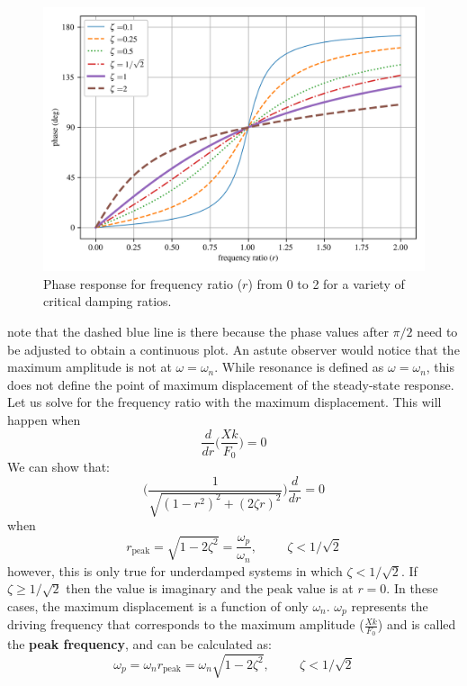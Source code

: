 \documentclass[12pt,letter]{article}
\begin{document}
	\begin{figure}[H]
		\centering
		\includegraphics[]{../figures/underdamped_frequency_response_phase.png}
		\caption{Phase response for frequency ratio ($r$) from 0 to 2 for a variety of critical damping ratios.}
		\label{fig:underdamped_frequency_response_phase}
	\end{figure}				
	\noindent note that the dashed blue line is there because the phase values after $\pi/2$ need to be adjusted to obtain a continuous plot. An astute observer would notice that the maximum amplitude is not at $\omega = \omega_n$. While resonance is defined as $\omega = \omega_n$, this does not define the point of maximum displacement of the steady-state response. Let us solve for the frequency ratio with the maximum displacement. This will happen when
	\begin{equation}
		\frac{d}{dr}\Bigg(\frac{Xk}{F_0} \Bigg)= 0
	\end{equation}				
	We can show that:
	\begin{equation}
	\Bigg(\frac{1}{\sqrt{(1-r^2)^2+(2\zeta r)^2}}\Bigg)	\frac{d}{dr} =0
	\end{equation}	
	when 
	\begin{equation}
	r_{\text{peak}} = \sqrt{1-2 \zeta^2}= \frac{\omega_p}{\omega_n}, \hspace{1cm} \zeta<1/\sqrt{2} 
	\end{equation}				
	however, this is only true for underdamped systems in which $\zeta<1/\sqrt{2}$. If $\zeta \ge 1/\sqrt{2}$ then the value is imaginary and the peak value is at $r=0$. In these cases, the maximum displacement is a function of only $\omega_n$. $\omega_p$ represents the driving frequency that corresponds to the maximum amplitude ($\frac{Xk}{F_0}$) and is called the \textbf{peak frequency}, and can be calculated as:
	\begin{equation}
	\omega_p = \omega_n r_{\text{peak}} = \omega_n \sqrt{1-2 \zeta^2}, \hspace{1cm} \zeta<1/\sqrt{2} 
	\end{equation}				
	
\end{document}

